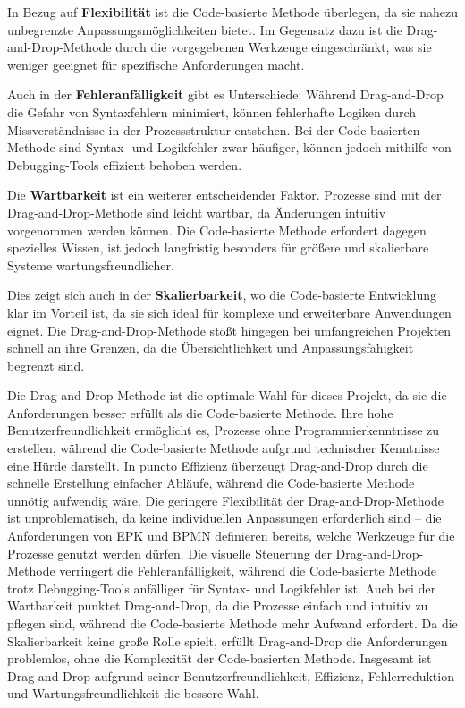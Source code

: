 In Bezug auf \textbf{Flexibilität} ist die Code-basierte Methode überlegen, da sie nahezu unbegrenzte Anpassungsmöglichkeiten bietet. Im Gegensatz dazu ist die Drag-and-Drop-Methode durch die vorgegebenen Werkzeuge eingeschränkt, was sie weniger geeignet für spezifische Anforderungen macht.

Auch in der \textbf{Fehleranfälligkeit} gibt es Unterschiede: Während Drag-and-Drop die Gefahr von Syntaxfehlern minimiert, können fehlerhafte Logiken durch Missverständnisse in der Prozessstruktur entstehen. Bei der Code-basierten Methode sind Syntax- und Logikfehler zwar häufiger, können jedoch mithilfe von Debugging-Tools effizient behoben werden.

Die \textbf{Wartbarkeit} ist ein weiterer entscheidender Faktor. Prozesse sind mit der Drag-and-Drop-Methode sind leicht wartbar, da Änderungen intuitiv vorgenommen werden können. Die Code-basierte Methode erfordert dagegen spezielles Wissen, ist jedoch langfristig besonders für größere und skalierbare Systeme wartungsfreundlicher.

Dies zeigt sich auch in der \textbf{Skalierbarkeit}, wo die Code-basierte Entwicklung klar im Vorteil ist, da sie sich ideal für komplexe und erweiterbare Anwendungen eignet. Die Drag-and-Drop-Methode stößt hingegen bei umfangreichen Projekten schnell an ihre Grenzen, da die Übersichtlichkeit und Anpassungsfähigkeit begrenzt sind.

Die Drag-and-Drop-Methode ist die optimale Wahl für dieses Projekt, da sie die Anforderungen besser erfüllt als die Code-basierte Methode. Ihre hohe Benutzerfreundlichkeit ermöglicht es, Prozesse ohne Programmierkenntnisse zu erstellen, während die Code-basierte Methode aufgrund technischer Kenntnisse eine Hürde darstellt.
In puncto Effizienz überzeugt Drag-and-Drop durch die schnelle Erstellung einfacher Abläufe, während die Code-basierte Methode unnötig aufwendig wäre. Die geringere Flexibilität der Drag-and-Drop-Methode ist unproblematisch, da keine individuellen Anpassungen erforderlich sind – die Anforderungen von EPK und BPMN definieren bereits, welche Werkzeuge für die Prozesse genutzt werden dürfen.
Die visuelle Steuerung der Drag-and-Drop-Methode verringert die Fehleranfälligkeit, während die Code-basierte Methode trotz Debugging-Tools anfälliger für Syntax- und Logikfehler ist. Auch bei der Wartbarkeit punktet Drag-and-Drop, da die Prozesse einfach und intuitiv zu pflegen sind, während die Code-basierte Methode mehr Aufwand erfordert.
Da die Skalierbarkeit keine große Rolle spielt, erfüllt Drag-and-Drop die Anforderungen problemlos, ohne die Komplexität der Code-basierten Methode. Insgesamt ist Drag-and-Drop aufgrund seiner Benutzerfreundlichkeit, Effizienz, Fehlerreduktion und Wartungsfreundlichkeit die bessere Wahl.

